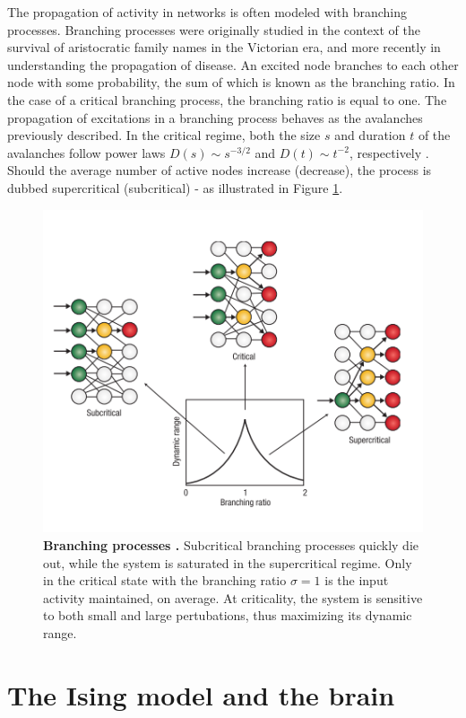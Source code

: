 \documentclass[12pt]{article}
\begin{document}
The propagation of activity in networks is often modeled with branching processes. Branching processes were originally studied in the context of the survival of aristocratic family names in the Victorian era\cite{Watson2014}, and more recently in understanding the propagation of disease. An excited node branches to each other node with some probability, the sum of which is known as the branching ratio. In the case of a critical branching process, the branching ratio is equal to one. The propagation of excitations in a branching process behaves as the avalanches previously described. In the critical regime, both the size $s$ and duration $t$ of the avalanches follow power laws $ D(s) \sim s^{-3/2} $ and $ D(t) \sim t^{-2} $, respectively \cite{Larremore2014}. Should the average number of active nodes increase (decrease), the process is dubbed supercritical (subcritical) - as illustrated in Figure \ref{Figure::Critical Branching Process}. 

\begin{figure}      
  \begin{center}    
 \includegraphics[width=.7\textwidth]{Branchingprocesschialvo}    
    \caption{\textbf{Branching processes \cite{Chialvo2006a}.} Subcritical branching processes quickly die out, while the system is saturated in the supercritical regime. Only in the critical state with the branching ratio $\sigma = 1$ is the input activity maintained, on average. At criticality, the system is sensitive to both small and large pertubations, thus maximizing its dynamic range.}
   \label{Figure::Critical Branching Process}   
  \end{center}     
   \end{figure}

\section*{The Ising model and the brain}
\end{document}
